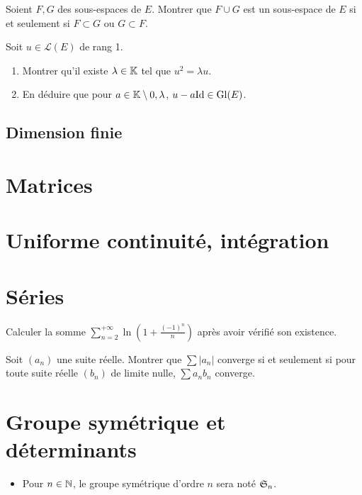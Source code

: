 \documentclass[12pt,a4paper]{exo_book}
\begin{document}
\begin{exo}
    Soient $F,G$ des sous-espaces de $E$. Montrer que $F \cup G$ est un sous-espace de $E$ si et seulement si $F \subset G$ ou $G \subset F$.
\end{exo}

\begin{exo}
    Soit $u\in \mathcal{L}(E)$ de rang 1.
    \begin{enumerate}
        \item Montrer qu'il existe $\lambda \in \mathbb{K}$ tel que $u^2 = \lambda u$.
        \item En déduire que pour $a \in \mathbb{K} \setminus {0,\lambda}$, $u - a \mathrm{Id} \in \operatorname{Gl}(E)$.
    \end{enumerate}
\end{exo}

\section{Dimension finie}

\chapter{Matrices}

\chapter{Uniforme continuité, intégration}

\chapter{Séries}

\begin{exo}
    Calculer la somme $\sum_{n=2}^{+\infty} \ln \left(1 + \frac{(-1)^n}{n} \right)$ après avoir vérifié son existence.
\end{exo}

\begin{exo}
    Soit $(a_n)$ une suite réelle. Montrer que $\sum |a_n|$ converge si et seulement si pour toute suite réelle $(b_n)$ de limite nulle, $\sum a_n b_n$ converge.
\end{exo}

\chapter{Groupe symétrique et déterminants}

\begin{notation}
\hspace{1pt}
\begin{itemize}
    \item Pour $n \in \mathbb{N}$, le groupe symétrique d'ordre $n$ sera noté $\frak{S}_n$.
\end{itemize}
\end{notation}
\end{document}
